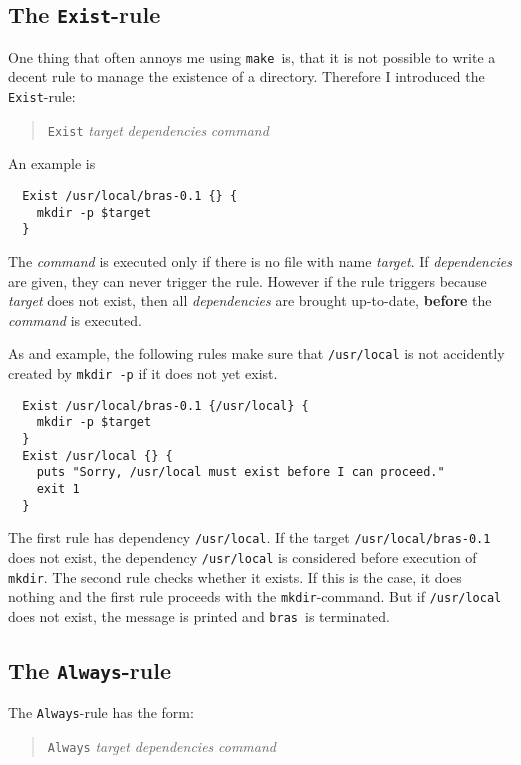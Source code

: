 \documentclass[12pt]{article}
\newcommand{\bras}{\texttt{bras}}
\newcommand{\make}{\texttt{make}}
\begin{document}
\subsection{The \texttt{Exist}-rule}

One thing that often annoys me using \make\ is, that it is not
possible to write a decent rule to manage the existence of a
directory. Therefore I introduced the \texttt{Exist}-rule:
\begin{quote}
  \texttt{Exist} \textit{target} \textit{dependencies} \textit{command}
\end{quote}
An example is
\begin{verbatim}
  Exist /usr/local/bras-0.1 {} {
    mkdir -p $target
  }
\end{verbatim}
The \textit{command} is executed only if there is no file with name
\textit{target}. If \textit{dependencies} are given, they can never
trigger the rule. However if the rule triggers because \textit{target}
does not exist, then all \textit{dependencies} are brought up-to-date,
\textbf{before} the \textit{command} is executed.

As and example, the following rules make sure that
\texttt{/usr/local} is not accidently created by \texttt{mkdir -p} if
it does not yet exist.

\begin{verbatim}
  Exist /usr/local/bras-0.1 {/usr/local} {
    mkdir -p $target
  }
  Exist /usr/local {} {
    puts "Sorry, /usr/local must exist before I can proceed."
    exit 1
  }	
\end{verbatim}
The first rule has dependency \texttt{/usr/local}. If the target
\texttt{/usr/local/bras-0.1}
does not exist, the dependency \texttt{/usr/local} is considered
before execution of \texttt{mkdir}. The second rule checks whether it
exists. If this is the case, it does nothing and the first rule
proceeds with the \texttt{mkdir}-command. But if
\texttt{/usr/local} does not exist, the message is printed and \bras\
is terminated.

\subsection{The \texttt{Always}-rule}

The \texttt{Always}-rule has the form:

\begin{quote}
  \texttt{Always} \textit{target} \textit{dependencies} \textit{command}
\end{quote}
\end{document}

